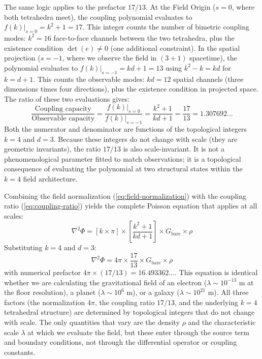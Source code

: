 The same logic applies to the prefactor $17/13$. At the Field Origin ($s=0$, where both tetrahedra meet), the coupling polynomial evaluates to $f(k)|_{s=0} = k^2 + 1 = 17$. This integer counts the number of bimetric coupling modes: $k^2 = 16$ face-to-face channels between the two tetrahedra, plus the existence condition $\det(e) \neq 0$ (one additional constraint). In the spatial projection ($s=-1$, where we observe the field in $(3+1)$ spacetime), the polynomial evaluates to $f(k)|_{s=-1} = kd+1 = 13$ using $k^2 - k = kd$ for $k = d+1$. This counts the observable modes: $kd = 12$ spatial channels (three dimensions times four directions), plus the existence condition in projected space. The ratio of these two evaluations gives:
\begin{equation}
\frac{\text{Coupling capacity}}{\text{Observable capacity}}
= \frac{f(k)|_{s=0}}{f(k)|_{s=-1}}
= \frac{k^2+1}{kd+1}
= \frac{17}{13}
= 1.307692\ldots
\label{eq:coupling-ratio}
\end{equation}
Both the numerator and denominator are functions of the topological integers $k=4$ and $d=3$. Because these integers do not change with scale (they are geometric invariants), the ratio $17/13$ is also scale-invariant. It is not a phenomenological parameter fitted to match observations; it is a topological consequence of evaluating the polynomial at two structural states within the $k=4$ field architecture.

Combining the field normalization (\ref{eq:field-normalization}) with the coupling ratio (\ref{eq:coupling-ratio}) yields the complete Poisson equation that applies at all scales:
\begin{equation}
\nabla^2\Phi = \left[k\times\pi\right] \times \left[\frac{k^2+1}{kd+1}\right] \times G_{\text{bare}} \times \rho
\label{eq:poisson-general}
\end{equation}
Substituting $k=4$ and $d=3$:
\begin{equation}
\nabla^2\Phi = 4\pi \times \frac{17}{13} \times G_{\text{bare}} \times \rho
\label{eq:poisson-numeric}
\end{equation}
with numerical prefactor $4\pi \times (17/13) = 16.493362\ldots$. This equation is identical whether we are calculating the gravitational field of an electron ($\lambda \sim 10^{-13}$ m at the floor resolution), a planet ($\lambda \sim 10^6$ m), or a galaxy ($\lambda \sim 10^{21}$ m). All three factors (the normalization $4\pi$, the coupling ratio $17/13$, and the underlying $k=4$ tetrahedral structure) are determined by topological integers that do not change with scale. The only quantities that vary are the density $\rho$ and the characteristic scale $\lambda$ at which we evaluate the field, but these enter through the source term and boundary conditions, not through the differential operator or coupling constants.

